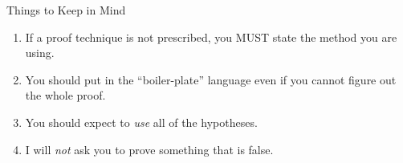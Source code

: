 \documentclass[12pt]{article}
\newcommand{\be}{\begin{enumerate}}
\newcommand{\ee}{\end{enumerate}}
\begin{document}
\begin{center} Things to Keep in Mind \end{center}
\be
\item If a proof technique is not prescribed, you MUST state the method you are using.
\item You should put in the ``boiler-plate'' language even if you cannot figure out the whole proof.
\item You should expect to \emph{use} all of the hypotheses.
\item I will \emph{not} ask you to prove something that is false.
\ee
\end{document}
